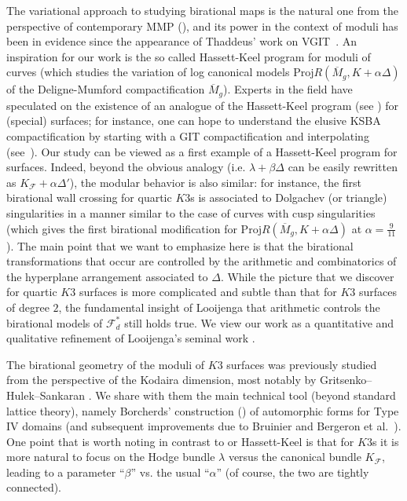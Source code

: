 \documentclass[11pt]{amsart}
\numberwithin{equation}{subsection}
\theoremstyle{plain}
\theoremstyle{remark}
\theoremstyle{definition}
\newcommand{\sF}{\mathscr{F}}
\newcommand{\calF}{\mathcal{F}}
\newcommand{\Proj}{\mathrm{Proj}}
\begin{document}
The variational approach to studying birational maps is the natural one from the perspective of contemporary MMP (\cite{bchmk}), and its power in the context of moduli has been in evidence since the appearance of  Thaddeus' work on VGIT~\cite{thaddeus}. An inspiration for our work is the so called Hassett-Keel program for moduli of curves (which studies the variation of log canonical models $\Proj R(\overline M_g,K+\alpha \Delta)$ of the Deligne-Mumford compactification $\overline M_g$). Experts in the field have speculated on the existence of an analogue of the Hassett-Keel program (see \cite{hh1,hh2}) for (special) surfaces; for instance, one can hope to understand the elusive KSBA compactification by starting with a GIT compactification and interpolating (see~\cite{gallardo}). Our study can be viewed as a first example of a Hassett-Keel program for surfaces. Indeed, beyond the obvious analogy (i.e. $\lambda+\beta \Delta$ can be easily rewritten as $K_\calF+\alpha \Delta'$), the modular behavior is also similar: for instance, the first birational wall crossing for quartic $K3$s is associated to Dolgachev (or triangle) singularities in a manner similar to the case of curves with cusp singularities (which gives the first birational modification for $\Proj R(\overline M_g,K+\alpha \Delta)$ at $\alpha=\frac{9}{11}$). The main point that we want to emphasize here is that the birational transformations that occur are controlled by the arithmetic and combinatorics of the hyperplane arrangement associated to $\Delta$. While the picture that we discover for quartic $K3$ surfaces is more complicated and subtle than that for  $K3$ surfaces of degree $2$, the fundamental insight of Looijenga that arithmetic controls the birational models of $\sF_d^*$ still holds true. We view our work as a quantitative and qualitative refinement of Looijenga's seminal work \cite{looijengacompact}. 

\medskip

The birational geometry of the moduli of $K3$ surfaces was previously studied from the perspective of the Kodaira dimension, most notably by Gritsenko--Hulek--Sankaran \cite{ghs}. We share with them the main technical tool (beyond standard lattice theory), namely Borcherds' construction (\cite{borcherds}) of automorphic forms for Type IV domains  (and subsequent improvements due to Bruinier \cite{bruinierbook} and Bergeron et al.~\cite{pick3nl}). One point that is worth noting in contrast to \cite{ghs} or Hassett-Keel is that for $K3$s it is more natural to focus on the Hodge bundle $\lambda$ versus the canonical bundle $K_{\calF}$, leading to a parameter ``$\beta$'' vs. the usual ``$\alpha$'' (of course, the two are tightly connected). 
\end{document}
